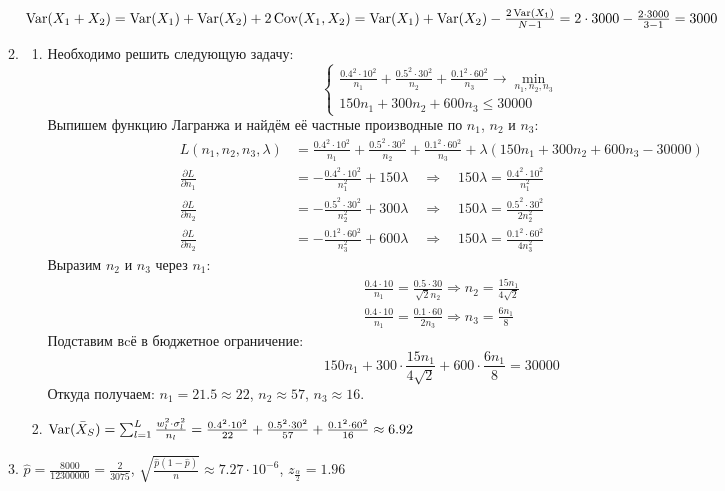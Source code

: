 \begin{enumerate}[resume]
\begin{enumerate}
$\operatorname{Var}(X_1+X_2) = \operatorname{Var}(X_1) + \operatorname{Var}(X_2) + 2\operatorname{Cov}(X_1, X_2) = \operatorname{Var}(X_1) + \operatorname{Var}(X_2) - \frac{2\operatorname{Var}(X_1)}{N-1} = 2 \cdot 3000 - \frac{2\cdot3000}{3-1} = 3000$
\item
\begin{enumerate}
\item Необходимо решить следующую задачу:
\[
\begin{cases}
\frac{0.4^2 \cdot 10^2}{n_1} + \frac{0.5^2 \cdot 30^2}{n_2} + \frac{0.1^2 \cdot 60^2}{n_3} \to \min_{n_1, n_2, n_3} \\
150 n_1 + 300 n_2 + 600 n_3 \leq 30000
\end{cases}
\]
Выпишем функцию Лагранжа и найдём её частные производные по $n_1$, $n_2$ и $n_3$:
\begin{align*}
L(n_1, n_2, n_3, \lambda) &= \frac{0.4^2 \cdot 10^2}{n_1} + \frac{0.5^2 \cdot 30^2}{n_2} + \frac{0.1^2 \cdot 60^2}{n_3} + \lambda (150 n_1 + 300 n_2 + 600 n_3 - 30000) \\
\frac{\partial L}{\partial n_1} &= -\frac{0.4^2 \cdot 10^2}{n_1^2} + 150 \lambda \quad \Rightarrow \quad 150 \lambda = \frac{0.4^2 \cdot 10^2}{n_1^2} \\
\frac{\partial L}{\partial n_2} &= -\frac{0.5^2 \cdot 30^2}{n_2^2} + 300 \lambda \quad \Rightarrow \quad 150 \lambda = \frac{0.5^2 \cdot 30^2}{2n_2^2} \\
\frac{\partial L}{\partial n_2} &= -\frac{0.1^2 \cdot 60^2}{n_3^2} + 600 \lambda \quad \Rightarrow \quad 150 \lambda = \frac{0.1^2 \cdot 60^2}{4n_3^2}
\end{align*}
Выразим $n_2$ и $n_3$ через $n_1$:
\begin{align*}
\frac{0.4 \cdot 10}{n_1} = \frac{0.5 \cdot 30}{\sqrt{2}n_2} \Rightarrow n_2 = \frac{15n_1}{4\sqrt{2}} \\
\frac{0.4 \cdot 10}{n_1} = \frac{0.1 \cdot 60}{2n_3} \Rightarrow n_3 = \frac{6n_1}{8}
\end{align*}
Подставим вcё в бюджетное ограничение:
\[
150 n_1 + 300 \cdot \frac{15n_1}{4\sqrt{2}} + 600 \cdot \frac{6n_1}{8} = 30000
\]
Откуда получаем: $n_1 = 21.5 \approx 22$, $n_2 \approx 57$, $n_3 \approx 16$.
\item
$\operatorname{Var}(\bar{X}_S) = \sum_{l=1}^L \frac{w_l^2 \cdot \sigma_l^2}{n_l}
= \frac{0.4^2 \cdot 10^2}{22} + \frac{0.5^2 \cdot 30^2}{57} + \frac{0.1^2 \cdot 60^2}{16}
\approx 6.92$
\end{enumerate}
\item $\hat{p} = \frac{8000}{12300000} = \frac{2}{3075}$,
$\sqrt{\frac{\hat{p}(1-\hat{p})}{n}} \approx 7.27 \cdot 10^{-6}$, $z_{\frac{\alpha}{2}} = 1.96$


\end{enumerate}
\end{enumerate}
